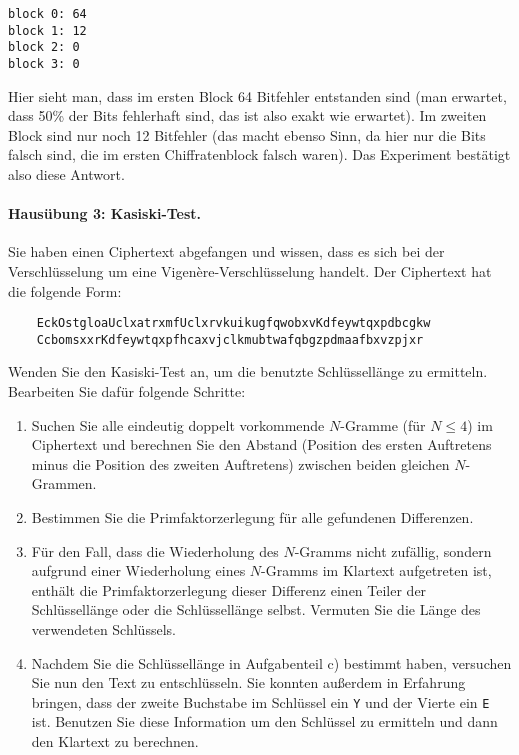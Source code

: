 \documentclass[
  ngerman,
  DIV=12
]{scrartcl}
\begin{document}
\begin{lstlisting}
block 0: 64
block 1: 12
block 2: 0
block 3: 0  
\end{lstlisting}
Hier sieht man, dass im ersten Block 64 Bitfehler entstanden sind (man erwartet, dass 50\% der Bits fehlerhaft sind, das ist also exakt wie erwartet). Im zweiten Block sind nur noch 12 Bitfehler (das macht ebenso Sinn, da hier nur die Bits falsch sind, die im ersten Chiffratenblock falsch waren). Das Experiment bestätigt also diese Antwort.

\paragraph{Hausübung 3: Kasiski-Test.} Sie haben einen Ciphertext abgefangen und wissen, dass es sich bei der Verschlüsselung um eine Vigenère-Verschlüsselung handelt. Der Ciphertext hat die folgende Form:
\begin{verbatim}
    EckOstgloaUclxatrxmfUclxrvkuikugfqwobxvKdfeywtqxpdbcgkw
    CcbomsxxrKdfeywtqxpfhcaxvjclkmubtwafqbgzpdmaafbxvzpjxr
\end{verbatim}
Wenden Sie den Kasiski-Test an, um die benutzte Schlüssellänge zu ermitteln. Bearbeiten Sie dafür folgende Schritte:
\begin{enumerate}[label=\alph*)]
\item Suchen Sie alle eindeutig doppelt vorkommende $N$-Gramme (für $N \leq 4$) im Ciphertext und berechnen Sie den Abstand (Position des ersten Auftretens minus die Position des zweiten Auftretens) zwischen beiden gleichen $N$-Grammen.
\item Bestimmen Sie die Primfaktorzerlegung für alle gefundenen Differenzen.
\item Für den Fall, dass die Wiederholung des $N$-Gramms nicht zufällig, sondern aufgrund einer Wiederholung eines $N$-Gramms im Klartext aufgetreten ist, enthält die Primfaktorzerlegung dieser Differenz einen Teiler der Schlüssellänge oder die Schlüssellänge selbst. Vermuten Sie die Länge des verwendeten Schlüssels.
\item Nachdem Sie die Schlüssellänge in Aufgabenteil c) bestimmt haben, versuchen Sie nun den Text zu entschlüsseln. Sie konnten außerdem in Erfahrung bringen, dass der zweite Buchstabe im Schlüssel ein \verb|Y| und der Vierte ein \verb|E| ist. Benutzen Sie diese Information um den Schlüssel zu ermitteln und dann den Klartext zu berechnen.
\end{enumerate}



\end{document}
